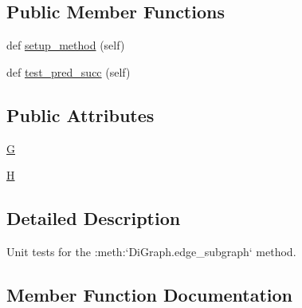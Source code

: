 \subsection*{Public Member Functions}
\begin{DoxyCompactItemize}
\item 
def \hyperlink{classnetworkx_1_1classes_1_1tests_1_1test__digraph_1_1TestEdgeSubgraph_a6b377a801333642dd399094b8d1e5d92}{setup\+\_\+method} (self)
\item 
def \hyperlink{classnetworkx_1_1classes_1_1tests_1_1test__digraph_1_1TestEdgeSubgraph_a0fd93d2a500d73660a0ddcb76ef5764a}{test\+\_\+pred\+\_\+succ} (self)
\end{DoxyCompactItemize}
\subsection*{Public Attributes}
\begin{DoxyCompactItemize}
\item 
\hyperlink{classnetworkx_1_1classes_1_1tests_1_1test__digraph_1_1TestEdgeSubgraph_abbace50081ef999c2240c686377122e8}{G}
\item 
\hyperlink{classnetworkx_1_1classes_1_1tests_1_1test__digraph_1_1TestEdgeSubgraph_a5673ffb4cd38829b90a3ce8434f9d03c}{H}
\end{DoxyCompactItemize}


\subsection{Detailed Description}
\begin{DoxyVerb}Unit tests for the :meth:`DiGraph.edge_subgraph` method.\end{DoxyVerb}
 

\subsection{Member Function Documentation}
\mbox{\label{classnetworkx_1_1classes_1_1tests_1_1test__digraph_1_1TestEdgeSubgraph_a6b377a801333642dd399094b8d1e5d92}} 
